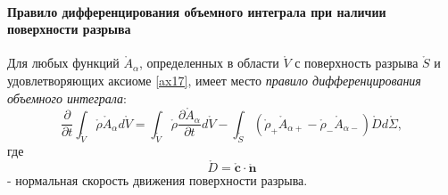 	\paragraph{Правило дифференцирования объемного интеграла при наличии поверхности разрыва}
	\begin{theorem}
		Для любых функций $\mathring{A}_\alpha$, определенных в области $\mathring{V}$ с поверхность разрыва $\mathring{S}$ и удовлетворяющих аксиоме \ref{ax17}, имеет место \textit{правило дифференцирования объемного интеграла}:
		\[
		\frac{\partial}{\partial t}\int_{\mathring{V}}\mathring{\rho}\mathring{A}_\alpha d\mathring{V}=\int_{\mathring{V}}\mathring{\rho}	\frac{\partial\mathring{A}_\alpha}{\partial t}d\mathring{V}-\int_{\mathring{S}}\left(\mathring{\rho}_+\mathring{A}_{\alpha+}-\mathring{\rho}_-\mathring{A}_{\alpha-}\right)\mathring{D}d\mathring{\Sigma},
		\]
		где
		\[
			\mathring{D}=\mathring{\mathbf{c}}\cdot\mathring{\mathbf{n}}
		\]
		- нормальная скорость движения поверхности разрыва.
	\end{theorem}